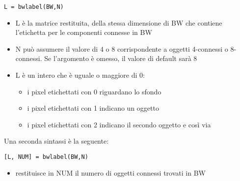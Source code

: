 \begin{lstlisting}
L = bwlabel(BW,N)
\end{lstlisting}

\begin{itemize}
	\item L è la matrice restituita, della stessa dimensione di BW che contiene l'etichetta per le componenti connesse in BW
	
	\item N può assumere il valore di 4 o 8 corrispondente a oggetti 4-connessi o 8-connessi. Se l'argomento è omesso, il valore di default sarà 8
	
	\item L è un intero che è uguale o maggiore di 0:
	\begin{itemize}
		\item i pixel etichettati con 0 riguardano lo sfondo
		
		\item i pixel etichettati con 1 indicano un oggetto
		
		\item i pixel etichettati con 2 indicano il secondo oggetto e così via
	\end{itemize} 
\end{itemize}

Una seconda sintassi è la seguente:

\begin{lstlisting}
[L, NUM] = bwlabel(BW,N)
\end{lstlisting}

\begin{itemize}
	\item restituisce in NUM il numero di oggetti connessi trovati in BW
\end{itemize}